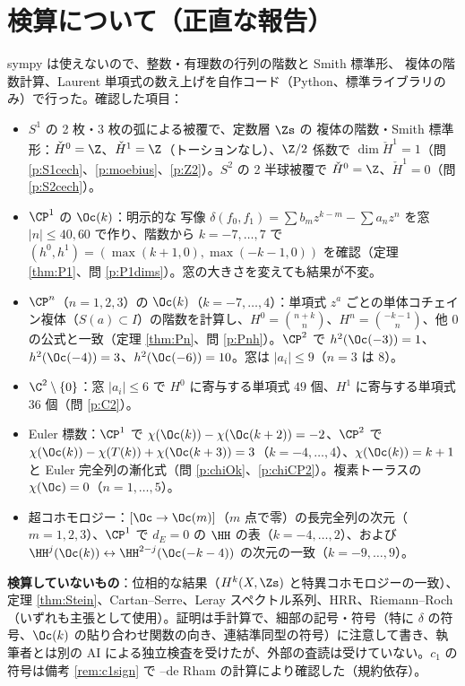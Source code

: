 \section*{検算について（正直な報告）}
sympy は使えないので、整数・有理数の行列の階数と Smith 標準形、\Cech{} 複体の階数計算、Laurent 単項式の数え上げを自作コード（Python、標準ライブラリのみ）で行った。確認した項目：
\begin{itemize}
\item $S^1$ の 2 枚・3 枚の弧による被覆で、定数層 $\Zs$ の \Cech{} 複体の階数・Smith 標準形：$\check H^0=\Z$、$\check H^1=\Z$（トーションなし）、$\Z/2$ 係数で $\dim\check H^1=1$（問 \ref{p:S1cech}、\ref{p:moebius}、\ref{p:Z2}）。$S^2$ の 2 半球被覆で $\check H^0=\Z$、$\check H^1=0$（問 \ref{p:S2cech}）。
\item $\CP^1$ の $\Oc(k)$：明示的な \Cech{} 写像 $\delta(f_0,f_1)=\sum b_mz^{k-m}-\sum a_nz^n$ を窓 $|n|\le40,60$ で作り、階数から $k=-7,\dots,7$ で $(h^0,h^1)=(\max(k+1,0),\max(-k-1,0))$ を確認（定理 \ref{thm:P1}、問 \ref{p:P1dims}）。窓の大きさを変えても結果が不変。
\item $\CP^n$（$n=1,2,3$）の $\Oc(k)$（$k=-7,\dots,4$）：単項式 $z^a$ ごとの単体コチェイン複体（$S(a)\subset I$）の階数を計算し、$H^0=\binom{n+k}n$、$H^n=\binom{-k-1}n$、他 $0$ の公式と一致（定理 \ref{thm:Pn}、問 \ref{p:Pnh}）。$\CP^2$ で $h^2(\Oc(-3))=1$、$h^2(\Oc(-4))=3$、$h^2(\Oc(-6))=10$。窓は $|a_i|\le9$（$n=3$ は $8$）。
\item $\C^2\setminus\{0\}$：窓 $|a_i|\le6$ で $H^0$ に寄与する単項式 $49$ 個、$H^1$ に寄与する単項式 $36$ 個（問 \ref{p:C2}）。
\item Euler 標数：$\CP^1$ で $\chi(\Oc(k))-\chi(\Oc(k+2))=-2$、$\CP^2$ で $\chi(\Oc(k))-\chi(T(k))+\chi(\Oc(k+3))=3$（$k=-4,\dots,4$）、$\chi(\Oc(k))=k+1$ と Euler 完全列の漸化式（問 \ref{p:chiOk}、\ref{p:chiCP2}）。複素トーラスの $\chi(\Oc)=0$（$n=1,\dots,5$）。
\item 超コホモロジー：$[\Oc\to\Oc(m)]$（$m$ 点で零）の長完全列の次元（$m=1,2,3$）、$\CP^1$ で $d_E=0$ の $\HH$ の表（$k=-4,\dots,2$）、および $\HH^j(\Oc(k))\leftrightarrow\HH^{2-j}(\Oc(-k-4))$ の次元の一致（$k=-9,\dots,9$）。
\end{itemize}
\textbf{検算していないもの}：位相的な結果（$H^k(X,\Zs)$ と特異コホモロジーの一致）、定理 \ref{thm:Stein}、Cartan--Serre、Leray スペクトル系列、HRR、Riemann--Roch（いずれも主張として使用）。証明は手計算で、細部の記号・符号（特に $\delta$ の符号、$\Oc(k)$ の貼り合わせ関数の向き、連結準同型の符号）に注意して書き、執筆者とは別の AI による独立検査を受けたが、外部の査読は受けていない。$c_1$ の符号は備考 \ref{rem:c1sign} で \Cech{}--de Rham の計算により確認した（規約依存）。
